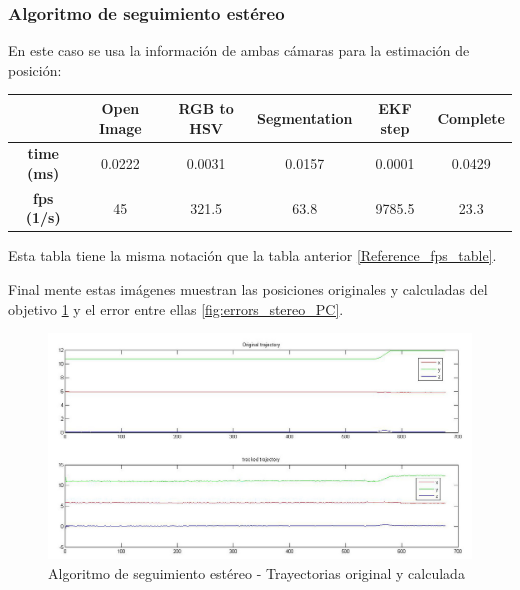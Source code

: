 	
	\newpage
	
		
	\subsubsection{Algoritmo de seguimiento est\'ereo}
	
	En este caso se usa la informaci\'on de ambas c\'amaras para la estimaci\'on de posici\'on: \\
		
	{                
	\centering
		\begin{tabular}{|c|c|c|c|c||c|}
		\hline  					&  Open Image	&  RGB to HSV 	& Segmentation 	& EKF step  & Complete \\ 
		\hline  \textbf{time (ms)}	&	0.0222		& 	0.0031 		&  	0.0157		&  	0.0001 	&  0.0429		\\ 
		\hline  \textbf{fps (1/s)}	& 	45 			& 	321.5 		& 	63.8 		& 9785.5	&  23.3		\\ 
		\hline 
		\end{tabular} 
	}
	\newline
	
	Esta tabla tiene la misma notaci\'on que la tabla anterior \ref{Reference_fps_table}.
	
	Final mente estas im\'agenes muestran las posiciones originales y calculadas del objetivo \ref{fig:trajectories_stereo_PC} y el error entre ellas \ref{fig:errors_stereo_PC}.
	
	\begin{figure}[hp]
		\centering
		\includegraphics[width=\linewidth]{../Images/c4/trajs_stereo}
		\caption{Algoritmo de seguimiento est\'ereo - Trayectorias original y calculada}
		\label{fig:trajectories_stereo_PC}
	\end{figure}
	
